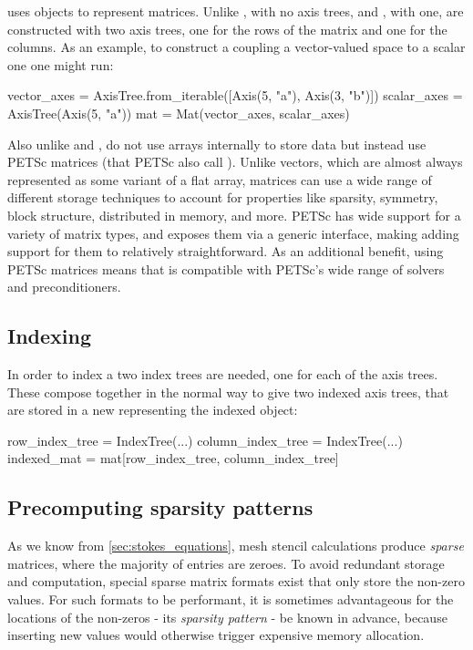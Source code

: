 \documentclass[thesis]{subfiles}
\begin{document}
 uses  objects to represent matrices.
Unlike , with no axis trees, and , with one,  are constructed with two axis trees, one for the rows of the matrix and one for the columns.
As an example, to construct a  coupling a vector-valued space to a scalar one one might run:
\begin{pyinline}
  vector_axes = AxisTree.from_iterable([Axis(5, "a"),
                                        Axis(3, "b")])
  scalar_axes = AxisTree(Axis(5, "a"))
  mat = Mat(vector_axes, scalar_axes)
\end{pyinline}

Also unlike  and ,  do not use \numpy{} arrays internally to store data but instead use PETSc matrices (that PETSc also call ).
Unlike vectors, which are almost always represented as some variant of a flat array, matrices can use a wide range of different storage techniques to account for properties like sparsity, symmetry, block structure, distributed in memory, and more.
PETSc has wide support for a variety of matrix types, and exposes them via a generic interface, making adding support for them to  relatively straightforward.
As an additional benefit, using PETSc matrices means that  is compatible with PETSc's wide range of solvers and preconditioners.

\subsection{Indexing}

In order to index a  two index trees are needed, one for each of the axis trees.
These compose together in the normal way to give two indexed axis trees, that are stored in a new  representing the indexed object:
\begin{pyinline}
  row_index_tree = IndexTree(...)
  column_index_tree = IndexTree(...)
  indexed_mat = mat[row_index_tree, column_index_tree]
\end{pyinline}

\subsection{Precomputing sparsity patterns}

As we know from \cref{sec:stokes_equations}, mesh stencil calculations produce \emph{sparse} matrices, where the majority of entries are zeroes.
To avoid redundant storage and computation, special sparse matrix formats exist that only store the non-zero values.
For such formats to be performant, it is sometimes advantageous for the locations of the non-zeros - its \emph{sparsity pattern} - be known in advance, because inserting new values would otherwise trigger expensive memory allocation.
\end{document}
